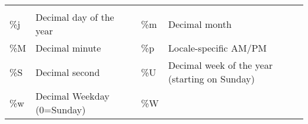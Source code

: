 \documentclass[
  11pt,
]{krantz}
\begin{document}
\begin{table}
\begin{tabular}{llll}
\begin{minipage}[t]{0.47\columnwidth}
\end{minipage}\tabularnewline
\begin{minipage}[t]{0.05\columnwidth}\raggedright
\%j\strut
\end{minipage} & \begin{minipage}[t]{0.31\columnwidth}\raggedright
Decimal day of the year\strut
\end{minipage} & \begin{minipage}[t]{0.05\columnwidth}\raggedright
\%m\strut
\end{minipage} & \begin{minipage}[t]{0.47\columnwidth}\raggedright
Decimal month\strut
\end{minipage}\tabularnewline
\begin{minipage}[t]{0.05\columnwidth}\raggedright
\%M\strut
\end{minipage} & \begin{minipage}[t]{0.31\columnwidth}\raggedright
Decimal minute\strut
\end{minipage} & \begin{minipage}[t]{0.05\columnwidth}\raggedright
\%p\strut
\end{minipage} & \begin{minipage}[t]{0.47\columnwidth}\raggedright
Locale-specific AM/PM\strut
\end{minipage}\tabularnewline
\begin{minipage}[t]{0.05\columnwidth}\raggedright
\%S\strut
\end{minipage} & \begin{minipage}[t]{0.31\columnwidth}\raggedright
Decimal second\strut
\end{minipage} & \begin{minipage}[t]{0.05\columnwidth}\raggedright
\%U\strut
\end{minipage} & \begin{minipage}[t]{0.47\columnwidth}\raggedright
Decimal week of the year (starting on Sunday)\strut
\end{minipage}\tabularnewline
\begin{minipage}[t]{0.05\columnwidth}\raggedright
\%w\strut
\end{minipage} & \begin{minipage}[t]{0.31\columnwidth}\raggedright
Decimal Weekday (0=Sunday)\strut
\end{minipage} & \begin{minipage}[t]{0.05\columnwidth}\raggedright
\%W\strut
\end{minipage} & \begin{minipage}[t]{0.47\columnwidth}\raggedright

\end{minipage}
\end{tabular}
\end{table}
\end{document}
